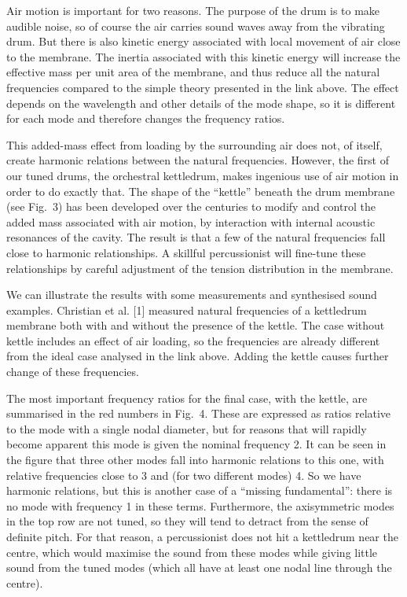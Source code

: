   Air motion is important for two reasons. The purpose of the drum is to make 
  audible noise, so of course the air carries sound waves away from the 
  vibrating drum. But there is also kinetic energy associated with local 
  movement of air close to the membrane. The inertia associated with this 
  kinetic energy will increase the effective mass per unit area of the 
  membrane, and thus reduce all the natural frequencies compared to the simple 
  theory presented in the link above. The effect depends on the wavelength and 
  other details of the mode shape, so it is different for each mode and 
  therefore changes the frequency ratios. 

  This added-mass effect from loading by the surrounding air does not, of 
  itself, create harmonic relations between the natural frequencies. However, 
  the first of our tuned drums, the orchestral kettledrum, makes ingenious use 
  of air motion in order to do exactly that. The shape of the ``kettle'' 
  beneath the drum membrane (see Fig.\ 3) has been developed over the centuries 
  to modify and control the added mass associated with air motion, by 
  interaction with internal acoustic resonances of the cavity. The result is 
  that a few of the natural frequencies fall close to harmonic relationships. A 
  skillful percussionist will fine-tune these relationships by careful 
  adjustment of the tension distribution in the membrane. 

  We can illustrate the results with some measurements and synthesised sound 
  examples. Christian et al. [1] measured natural frequencies of a kettledrum 
  membrane both with and without the presence of the kettle. The case without 
  kettle includes an effect of air loading, so the frequencies are already 
  different from the ideal case analysed in the link above. Adding the kettle 
  causes further change of these frequencies. 

  The most important frequency ratios for the final case, with the kettle, are 
  summarised in the red numbers in Fig.\ 4. These are expressed as ratios 
  relative to the mode with a single nodal diameter, but for reasons that will 
  rapidly become apparent this mode is given the nominal frequency 2. It can be 
  seen in the figure that three other modes fall into harmonic relations to 
  this one, with relative frequencies close to 3 and (for two different modes) 
  4. So we have harmonic relations, but this is another case of a ``missing 
  fundamental'': there is no mode with frequency 1 in these terms. Furthermore, 
  the axisymmetric modes in the top row are not tuned, so they will tend to 
  detract from the sense of definite pitch. For that reason, a percussionist 
  does not hit a kettledrum near the centre, which would maximise the sound 
  from these modes while giving little sound from the tuned modes (which all 
  have at least one nodal line through the centre). 

